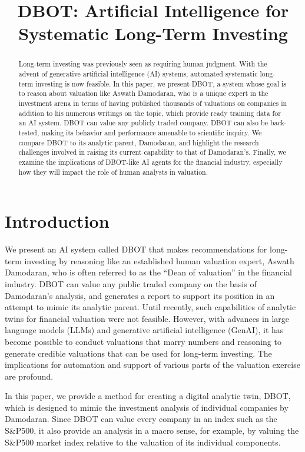 \documentclass[]{interact}
\title{DBOT: Artificial Intelligence for Systematic Long-Term Investing}
\author{
\name{Vasant Dhar\thanks{Email: vd1@stern.nyu.edu} and Jo\~{a}o Sedoc\thanks{Email: jsedoc@stern.nyu.edu}}
\affil{New York University}
}
\theoremstyle{plain}%
\theoremstyle{definition}
\theoremstyle{remark}
\begin{document}
\maketitle

\begin{abstract}
Long-term investing was previously seen as requiring human judgment. With the advent of generative artificial intelligence (AI) systems, automated systematic long-term investing is now feasible. In this paper, we present DBOT, a system whose goal is to reason about valuation like Aswath Damodaran, who is a unique expert in the investment arena in terms of having published thousands of valuations on companies in addition to his numerous writings on the topic, which provide ready training data for an AI system. DBOT can value any publicly traded company. DBOT can also be back-tested, making its behavior and performance amenable to scientific inquiry. We compare DBOT to its analytic parent, Damodaran, and highlight the research challenges involved in raising its current capability to that of Damodaran’s. Finally, we examine the implications of DBOT-like AI agents for the financial industry, especially how they will impact the role of human analysts in valuation.
\end{abstract}



\section{Introduction}
\label{sec:intro}
We present an AI system called DBOT that makes recommendations for long-term investing by reasoning like an established human valuation expert, Aswath Damodaran, who is often referred to as the ``Dean of valuation'' in the financial industry. DBOT can value any public traded company on the basis of Damodaran's analysis, and generates a report to support its position in an attempt to mimic its analytic parent. Until recently, such capabilities of analytic twins for financial valuation were not feasible. However, with advances in large language models (LLMs) and generative artificial intelligence (GenAI), it has become possible to conduct valuations that marry numbers and reasoning to generate credible valuations that can be used for long-term investing. The implications for automation and support of various parts of the valuation exercise are profound. 

In this paper, we provide a method for creating a digital analytic twin, DBOT, which is designed to mimic the investment analysis of individual companies by Damodaran. Since DBOT can value every company in an index such as the S\&P500, it also provide an analysis in a macro sense, for example, by valuing the S\&P500 market index relative to the valuation of its individual components. 
\end{document}
